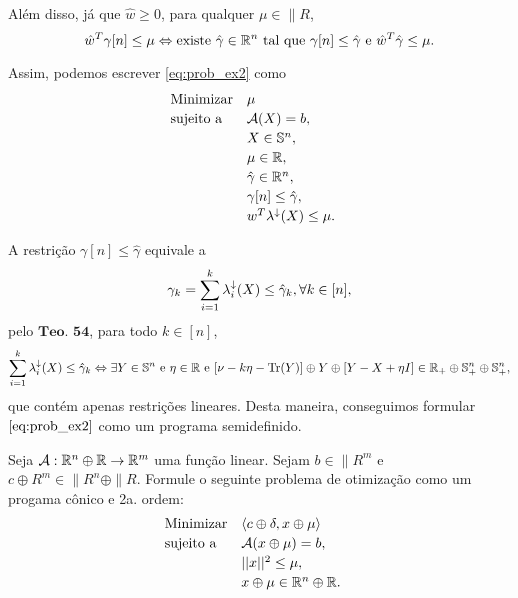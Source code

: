 \begin{homeworkProblemAnswer}
Além disso, já que $\hat{w} \geq 0$, para qualquer $\mu \in \|{R}$,
$$
    \hat{w}^T \gamma[n] \leq \mu \sse 
    \text{existe } \hat{\gamma} \in \|{R}^n \text{ tal que } \gamma[n] \leq \hat{\gamma} \text{ e } \hat{w}^T\hat{\gamma} \leq \mu.
$$

Assim, podemos escrever \eqref{eq:prob_ex2} como 
\begin{equation*}
    \begin{array}[!h]{lll}
        \text{Minimizar} & \mu                                              & \\[2pt]
        \text{sujeito a} & \"{A}(X) = b,                                    & \\[2pt]
                         & X \in \|{S}^n,                                   & \\[2pt]
                         & \mu \in \|{R},                                   & \\[2pt]
                         & \hat{\gamma} \in \|{R}^n,                        & \\[2pt]
                         & \gamma[n] \leq \hat{\gamma},                     & \\[2pt]
                         & w^T \eigen(X) \leq \mu.                          & \\
    \end{array}
\end{equation*}

A restrição $\gamma[n] \leq \hat{\gamma}$ equivale a
$$ \gamma_k = \sum \limits_{i=1}^k \eigen_i(X) \leq \hat{\gamma}_k, \forall k \in [n], $$
pelo $\textbf{Teo. 54}$, para todo $k \in [n]$, 
$$  
    \sum \limits_{i=1}^k \eigen_i(X) \leq \hat{\gamma}_k \sse 
    \exists Y \in \|{S}^n \text{ e } \eta \in \|{R} \text{ e } [\nu - k\eta - \Tr(Y)] \oplus Y \oplus [Y - X + \eta I] \in \|{R}_+ \oplus \|{S}_+^n \oplus \|{S}_+^n,
$$
que contém apenas restrições lineares. Desta maneira, conseguimos formular $\eqref{eq:prob_ex2}$ como um programa semidefinido.

\end{homeworkProblemAnswer}

\begin{homeworkProblem}
Seja $\"{A} : \|{R}^n \oplus \|{R} \rightarrow \|{R}^m$ uma função linear. Sejam $b \in \|{R}^m$ e $c \oplus R^m \in \|{R}^n \oplus \|{R}$. Formule o seguinte problema de otimização como um progama cônico e 2a. ordem:
\begin{equation} \label{eq:prob_ex3}
    \begin{array}[!h]{lll}
        \text{Minimizar} & \langle c \oplus \delta, x \oplus \mu \rangle    & \\[2pt]
        \text{sujeito a} & \"{A}(x \oplus \mu) = b,                          & \\[2pt]
                         & ||x||^2 \leq \mu,                                & \\[2pt]
                         & x \oplus \mu \in \|{R}^n \oplus \|{R}.           & \\
    \end{array}
\end{equation}
\end{homeworkProblem}

